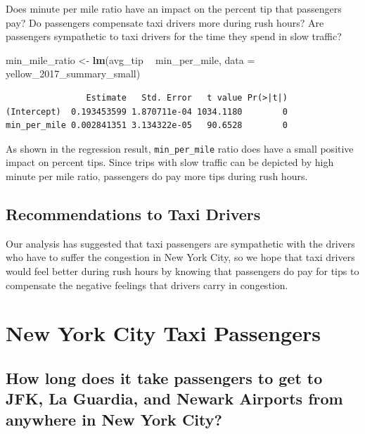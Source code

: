 \documentclass[12pt,twoside]{reedthesis}
\newenvironment{Shaded}{\begin{snugshade}}{\end{snugshade}}
\newcommand{\KeywordTok}[1]{\textcolor[rgb]{0.13,0.29,0.53}{\textbf{#1}}}
\newcommand{\DataTypeTok}[1]{\textcolor[rgb]{0.13,0.29,0.53}{#1}}
\newcommand{\StringTok}[1]{\textcolor[rgb]{0.31,0.60,0.02}{#1}}
\newcommand{\OperatorTok}[1]{\textcolor[rgb]{0.81,0.36,0.00}{\textbf{#1}}}
\newcommand{\NormalTok}[1]{#1}
\theoremstyle{definition}
\theoremstyle{definition}
\theoremstyle{definition}
\theoremstyle{remark}
\begin{document}
Does minute per mile ratio have an impact on the percent tip that
passengers pay? Do passengers compensate taxi drivers more during rush
hours? Are passengers sympathetic to taxi drivers for the time they
spend in slow traffic?
\begin{Shaded}
\begin{Highlighting}[]
\NormalTok{min_mile_ratio <-}\StringTok{ }\KeywordTok{lm}\NormalTok{(avg_tip }\OperatorTok{~}\StringTok{ }\NormalTok{min_per_mile, }\DataTypeTok{data =}\NormalTok{ yellow_2017_summary_small)}
\end{Highlighting}
\end{Shaded}
\begin{verbatim}
                Estimate   Std. Error   t value Pr(>|t|)
(Intercept)  0.193453599 1.870711e-04 1034.1180        0
min_per_mile 0.002841351 3.134322e-05   90.6528        0
\end{verbatim}
As shown in the regression result, \texttt{min\_per\_mile} ratio does
have a small positive impact on percent tips. Since trips with slow
traffic can be depicted by high minute per mile ratio, passengers do pay
more tips during rush hours.

\section{Recommendations to Taxi
Drivers}\label{recommendations-to-taxi-drivers}

Our analysis has suggested that taxi passengers are sympathetic with the
drivers who have to suffer the congestion in New York City, so we hope
that taxi drivers would feel better during rush hours by knowing that
passengers do pay for tips to compensate the negative feelings that
drivers carry in congestion.

\chapter{New York City Taxi Passengers}\label{chapter4}

\section{How long does it take passengers to get to JFK, La Guardia, and
Newark Airports from anywhere in New York
City?}\label{how-long-does-it-take-passengers-to-get-to-jfk-la-guardia-and-newark-airports-from-anywhere-in-new-york-city}
\end{document}
